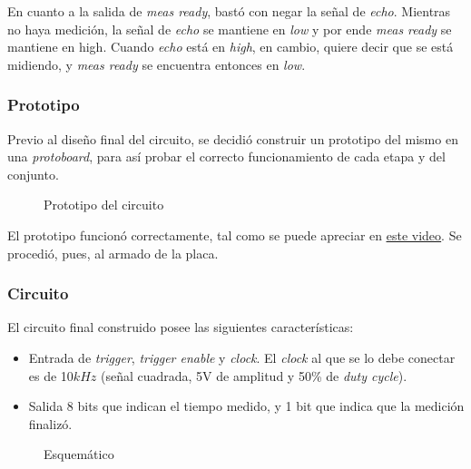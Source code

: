 \documentclass[../../e3_tp2_main.tex]{subfiles}
\begin{document}
En cuanto a la salida de \textit{meas ready}, bast\'o con negar la señal de \textit{echo}. Mientras no haya medición, la señal de \textit{echo} se mantiene en \textit{low} y por ende \textit{meas ready} se mantiene en high. Cuando \textit{echo} está en \textit{high}, en cambio, quiere decir que se está midiendo, y \textit{meas ready} se encuentra entonces en \textit{low}.

\subsubsection{Prototipo}
Previo al diseño final del circuito, se decidió construir un prototipo del mismo en una \textit{protoboard}, para así probar el correcto funcionamiento de cada etapa y del conjunto. 
\begin{figure}[H]	
	\centering
	\caption{Prototipo del circuito}
\end{figure}
El prototipo funcion\'o correctamente, tal como se puede apreciar en \href{https://youtu.be/xzRgiA1r85w}{\underline{este video}}. Se procedió, pues, al armado de la placa.
\subsubsection{Circuito}

El circuito final construido posee las siguientes características:
\begin{itemize}
	\item Entrada de \textit{trigger}, \textit{trigger enable} y \textit{clock}. El \textit{clock} al que se lo debe conectar es de 10$kHz$ (señal cuadrada, 5V de amplitud y 50\% de \textit{duty cycle}).
	\item Salida 8 bits que indican el tiempo medido, y 1 bit que indica que la medición finaliz\'o.
\end{itemize}

\begin{figure}[H]	
	\centering
	\caption{Esquem\'atico}
\end{figure}
\end{document}
